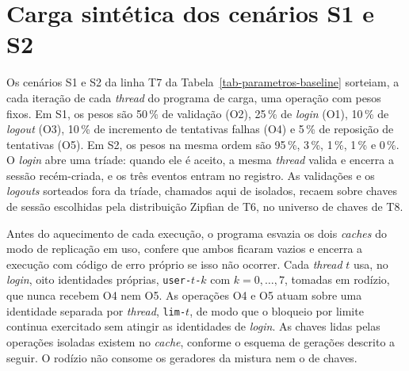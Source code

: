 \section*{Carga sintética dos cenários S1 e S2}
\label{sec-carga}

Os cenários S1 e S2 da linha T7 da Tabela~\ref{tab-parametros-baseline} sorteiam, a cada iteração de cada \emph{thread} do programa de carga, uma operação com pesos fixos. Em S1, os pesos são 50\,\% de validação (O2), 25\,\% de \emph{login} (O1), 10\,\% de \emph{logout} (O3), 10\,\% de incremento de tentativas falhas (O4) e 5\,\% de reposição de tentativas (O5). Em S2, os pesos na mesma ordem são 95\,\%, 3\,\%, 1\,\%, 1\,\% e 0\,\%. O \emph{login} abre uma tríade: quando ele é aceito, a mesma \emph{thread} valida e encerra a sessão recém-criada, e os três eventos entram no registro. As validações e os \emph{logouts} sorteados fora da tríade, chamados aqui de isolados, recaem sobre chaves de sessão escolhidas pela distribuição Zipfian de T6, no universo de chaves de T8.

Antes do aquecimento de cada execução, o programa esvazia os dois \emph{caches} do modo de replicação em uso, confere que ambos ficaram vazios e encerra a execução com código de erro próprio se isso não ocorrer. Cada \emph{thread} $t$ usa, no \emph{login}, oito identidades próprias, \texttt{user-}$t$\texttt{-}$k$ com $k = 0, \dots, 7$, tomadas em rodízio, que nunca recebem O4 nem O5. As operações O4 e O5 atuam sobre uma identidade separada por \emph{thread}, \texttt{lim-}$t$, de modo que o bloqueio por limite continua exercitado sem atingir as identidades de \emph{login}. As chaves lidas pelas operações isoladas existem no \emph{cache}, conforme o esquema de gerações descrito a seguir. O rodízio não consome os geradores da mistura nem o de chaves.

